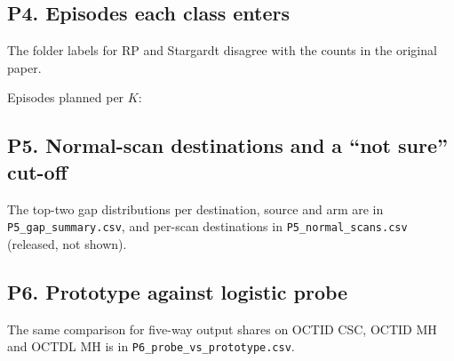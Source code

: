 \subsection*{P4. Episodes each class enters}
\begin{table}[!htbp]
\caption{Post hoc, rule committed 16 Nov 2026 (P4, main text Table~\ref{tab:p4}). Number of development episodes per $K$ (5 folds $\times$ 100 draws) in which each class has at least one query in the group, and so enters that group's average. The groups come from the size-only rule, so the counts are the same for all four models.}
\label{tab:p4entries}
\centering\footnotesize

\par\smallskip
{\footnotesize \fnRS The folder labels for RP and Stargardt disagree with the counts in the original paper.\par}
\end{table}
Episodes planned per $K$: 

\subsection*{P5. Normal-scan destinations and a ``not sure'' cut-off}
\begin{table}[!htbp]
\caption{Post hoc, rule committed 16 Nov 2026. A ``not sure'' cut-off per model, set at the 9th-smallest top-two score gap of the 169 patient-disjoint Kermany normals (8 lie below it), applied unchanged to OCTID and OCTDL normal scans. ``Sure'': gap at or above the cut-off. The Kermany row is calibration only, not a result. Normal recall is shown beside the false-rare rate, never in its place.}
\label{tab:p5}
\centering\footnotesize

\end{table}
The top-two gap distributions per destination, source and arm are in \texttt{P5\_gap\_summary.csv}, and per-scan destinations in \texttt{P5\_normal\_scans.csv} (released, not shown).

\subsection*{P6. Prototype against logistic probe}
\begin{table}[!htbp]
\caption{Post hoc, computed before the rules were timestamped (first computed 16 Nov 2026). Logistic probe minus prototype, five-way macro recall, paired over the first 25 draws: mean (5th to 95th percentile).}
\label{tab:p6}
\centering\footnotesize

\end{table}
The same comparison for five-way output shares on OCTID CSC, OCTID MH and OCTDL MH is in \texttt{P6\_probe\_vs\_prototype.csv}.


